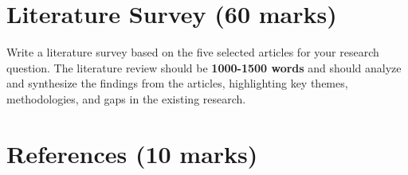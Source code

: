 \documentclass[a4paper,12pt]{article}
\begin{document}
\section{Literature Survey (60 marks)}
Write a literature survey based on the five selected articles for your research question. The literature review should be \textbf{1000-1500 words} and should analyze and synthesize the findings from the articles, highlighting key themes, methodologies, and gaps in the existing research.

\section{References (10 marks)}



\end{document}
